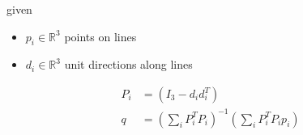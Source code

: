 \documentclass[12pt]{article}
\begin{document}
given
\begin{itemize}
\item $\textit{p}_{\textit{i}} \in \mathbb{R}^{ 3}$ points on lines
\item $\textit{d}_{\textit{i}} \in \mathbb{R}^{ 3}$ unit directions along lines
\end{itemize}

\begin{align*}
\textit{P}_{ \textit{i} } & = \left( I_{ 3 } - \textit{d}_{ \textit{i} }\textit{d}_{ \textit{i} }^T \right) \\
\textit{q} & = \left( \sum_\textit{i} \textit{P}_{ \textit{i} }^T\textit{P}_{ \textit{i} } \right)^{-1}\left( \sum_\textit{i} \textit{P}_{ \textit{i} }^T\textit{P}_{ \textit{i} }\textit{p}_{ \textit{i} } \right)
\end{align*}
\end{document}
